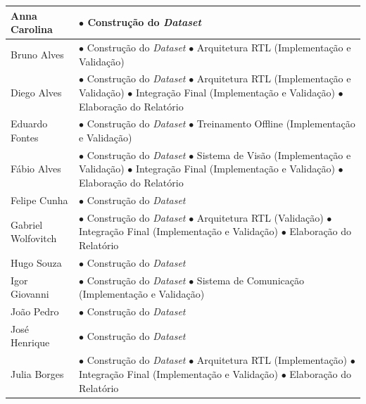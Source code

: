 \begin{xltabular}{\textwidth}{l X}
Anna Carolina & $\bullet$ Construção do \textit{Dataset} \\
\midrule
Bruno Alves & $\bullet$ Construção do \textit{Dataset} \newline $\bullet$ Arquitetura RTL (Implementação e Validação) \\
\midrule
Diego Alves & $\bullet$ Construção do \textit{Dataset} \newline $\bullet$ Arquitetura RTL (Implementação e Validação) \newline $\bullet$ Integração Final (Implementação e Validação) \newline $\bullet$ Elaboração do Relatório \\
\midrule
Eduardo Fontes & $\bullet$ Construção do \textit{Dataset} \newline $\bullet$ Treinamento Offline (Implementação e Validação)\\
\midrule
Fábio Alves & $\bullet$ Construção do \textit{Dataset} \newline $\bullet$ Sistema de Visão (Implementação e Validação) \newline $\bullet$ Integração Final (Implementação e Validação) \newline $\bullet$ Elaboração do Relatório \\
\midrule
Felipe Cunha & $\bullet$ Construção do \textit{Dataset} \\
\midrule
Gabriel Wolfovitch & $\bullet$ Construção do \textit{Dataset} \newline $\bullet$ Arquitetura RTL (Validação) \newline $\bullet$ Integração Final (Implementação e Validação) \newline $\bullet$ Elaboração do Relatório \\
\midrule
Hugo Souza & $\bullet$ Construção do \textit{Dataset} \\
\midrule
Igor Giovanni & $\bullet$ Construção do \textit{Dataset} \newline $\bullet$ Sistema de Comunicação (Implementação e Validação) \\
\midrule
João Pedro & $\bullet$ Construção do \textit{Dataset} \\
\midrule
José Henrique & $\bullet$ Construção do \textit{Dataset} \\
\midrule
Julia Borges & $\bullet$ Construção do \textit{Dataset} \newline $\bullet$ Arquitetura RTL (Implementação) \newline $\bullet$ Integração Final (Implementação e Validação) \newline $\bullet$ Elaboração do Relatório \\

\end{xltabular}
